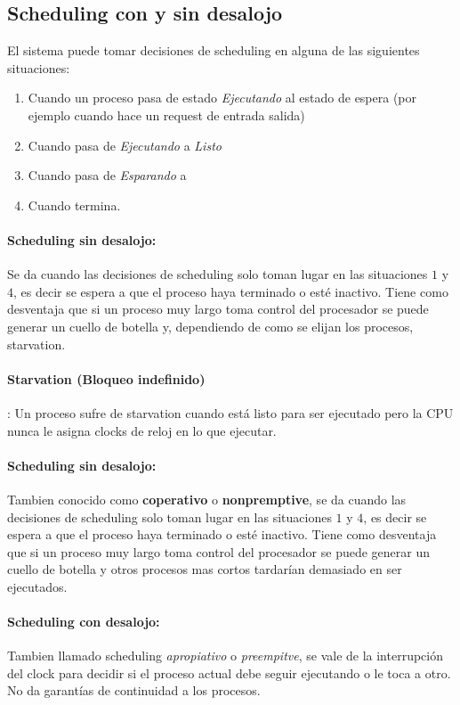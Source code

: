 	\subsection{Scheduling con y sin desalojo}
	
	El sistema puede tomar decisiones de scheduling en alguna de las siguientes situaciones:
	\begin{enumerate}
		\item Cuando un proceso pasa de estado \textit{Ejecutando} al estado de espera (por ejemplo cuando hace un request de entrada salida)
		\item Cuando pasa de \textit{Ejecutando} a \textit{Listo}
		\item Cuando pasa de \textit{Esparando} a 
		\item Cuando termina.
	\end{enumerate}

	\paragraph{Scheduling sin desalojo:} Se da cuando las decisiones de scheduling solo toman lugar en las situaciones $1$ y $4$, es decir se espera a que el proceso haya terminado o esté inactivo. Tiene como desventaja que si un proceso muy largo toma control del procesador se puede generar un cuello de botella y, dependiendo de como se elijan los procesos, starvation.
	
	\paragraph{Starvation (Bloqueo indefinido)}: Un proceso sufre de starvation cuando está listo para ser ejecutado pero la CPU nunca le asigna clocks de reloj en lo que ejecutar.
	
	\paragraph{Scheduling sin desalojo:} Tambien conocido como \textbf{coperativo} o \textbf{nonpremptive}, se da cuando las decisiones de scheduling solo toman lugar en las situaciones $1$ y $4$, es decir se espera a que el proceso haya terminado o esté inactivo. Tiene como desventaja que si un proceso muy largo toma control del procesador se puede generar un cuello de botella y otros procesos mas cortos tardarían demasiado en ser ejecutados.
	
	\paragraph{Scheduling con desalojo:} Tambien llamado scheduling \textit{apropiativo} o \textit{preempitve}, se vale de la interrupción del clock para decidir si el proceso actual debe seguir ejecutando o le toca a otro. No da garantías de continuidad a los procesos.
	
